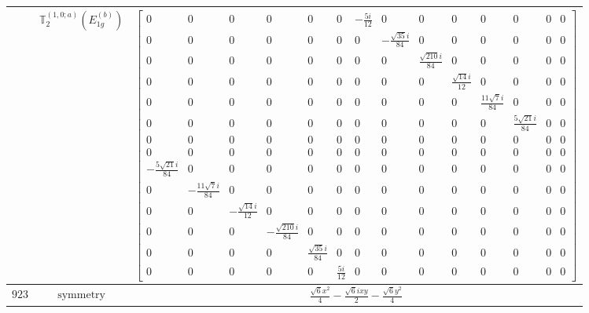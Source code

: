 \documentclass[fleqn,8pt,landscape]{jsarticle}
\begin{document}
\begin{longtable}{ccc}
$  $ & $ \mathbb{T}_{2}^{(1,0;a)}(E_{1g}^{(b)}) $ & $ \begin{bmatrix} 0 & 0 & 0 & 0 & 0 & 0 & - \frac{5 i}{12} & 0 & 0 & 0 & 0 & 0 & 0 & 0 \\ 0 & 0 & 0 & 0 & 0 & 0 & 0 & - \frac{\sqrt{35} i}{84} & 0 & 0 & 0 & 0 & 0 & 0 \\ 0 & 0 & 0 & 0 & 0 & 0 & 0 & 0 & \frac{\sqrt{210} i}{84} & 0 & 0 & 0 & 0 & 0 \\ 0 & 0 & 0 & 0 & 0 & 0 & 0 & 0 & 0 & \frac{\sqrt{14} i}{12} & 0 & 0 & 0 & 0 \\ 0 & 0 & 0 & 0 & 0 & 0 & 0 & 0 & 0 & 0 & \frac{11 \sqrt{7} i}{84} & 0 & 0 & 0 \\ 0 & 0 & 0 & 0 & 0 & 0 & 0 & 0 & 0 & 0 & 0 & \frac{5 \sqrt{21} i}{84} & 0 & 0 \\ 0 & 0 & 0 & 0 & 0 & 0 & 0 & 0 & 0 & 0 & 0 & 0 & 0 & 0 \\ 0 & 0 & 0 & 0 & 0 & 0 & 0 & 0 & 0 & 0 & 0 & 0 & 0 & 0 \\ - \frac{5 \sqrt{21} i}{84} & 0 & 0 & 0 & 0 & 0 & 0 & 0 & 0 & 0 & 0 & 0 & 0 & 0 \\ 0 & - \frac{11 \sqrt{7} i}{84} & 0 & 0 & 0 & 0 & 0 & 0 & 0 & 0 & 0 & 0 & 0 & 0 \\ 0 & 0 & - \frac{\sqrt{14} i}{12} & 0 & 0 & 0 & 0 & 0 & 0 & 0 & 0 & 0 & 0 & 0 \\ 0 & 0 & 0 & - \frac{\sqrt{210} i}{84} & 0 & 0 & 0 & 0 & 0 & 0 & 0 & 0 & 0 & 0 \\ 0 & 0 & 0 & 0 & \frac{\sqrt{35} i}{84} & 0 & 0 & 0 & 0 & 0 & 0 & 0 & 0 & 0 \\ 0 & 0 & 0 & 0 & 0 & \frac{5 i}{12} & 0 & 0 & 0 & 0 & 0 & 0 & 0 & 0 \end{bmatrix} $ \\ \hline
$ 923 $ & $ \text{symmetry} $ & $ \frac{\sqrt{6} x^{2}}{4} - \frac{\sqrt{6} i x y}{2} - \frac{\sqrt{6} y^{2}}{4} $ \\

\end{longtable}
\end{document}
